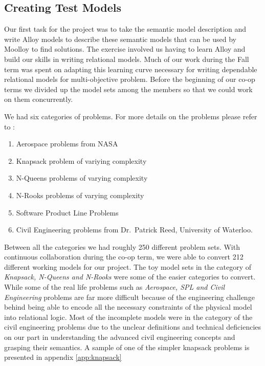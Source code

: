 \documentclass[11pt]{article}
\theoremstyle{definition}
\begin{document}
\subsection{Creating Test Models}
Our first task for the project was to take the semantic model description and write Alloy models to describe these semantic models that can be used by Moolloy to find solutions. The exercise involved us having to learn Alloy and build our skills in writing relational models. Much of our work during the Fall term was spent on adapting this learning curve necessary for writing dependable relational models for multi-objective problem. Before the beginning of our co-op terms we divided up the model sets among the members so that we could work on them concurrently.

We had six categories of problems. For more details on the problems please refer to \cite{ref:Rayside09}:

\begin{enumerate}
\item Aerospace problems from NASA
\item Knapsack problem of variying complexity
\item N-Queens problems of varying complexity
\item N-Rooks problems of varying complexity
\item Software Product Line Problems
\item Civil Engineering problems from Dr.\ Patrick Reed, University of Waterloo.
\end{enumerate}

Between all the categories we had roughly 250 different problem sets. With continuous collaboration during the co-op term, we were able to convert 212 different working models for our project. The toy model sets in the category of \emph{Knapsack, N-Queens and N-Rooks} were some of the easier categories to convert. While some of the real life problems such as \emph{Aerospace, SPL and Civil Engineering} problems are far more difficult because of the engineering challenge behind being able to encode all the necessary constraints of the physical model into relational logic. Most of the incomplete models were in the category of the civil engineering problems due to the unclear definitions and technical deficiencies on our part in understanding the advanced civil engineering concepts and grasping their semantics. A sample of one of the simpler knapsack problems is presented in appendix \ref{app:knapsack}
\end{document}
